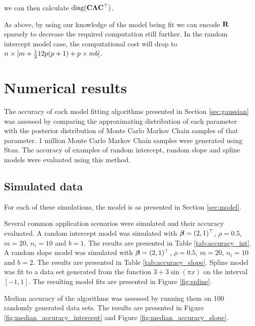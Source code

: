 \documentclass{amsart}[12pt]
\begin{document}
			\noindent we can then calculate $\text{diag}({\bf C} {\boldsymbol \Lambda} {\bf C}^\top)$.
				
			As above, by using our knowledge of the model being fit we can encode ${\bf R}$ sparsely to decrease
			the required   computation still further. In the random intercept model case, the computational cost will drop
			to   $n \times [m + \tfrac{1}{2}{1}{2} p (p + 1) + p \times m b]$.
				
			\section{Numerical results}
			\label{sec:results}
					
			The accuracy of each model fitting algorithms presented in Section \ref{sec:gaussian} was assessed by
			comparing the approximating distribution of each parameter with the posterior distribution of Monte Carlo
			Markov Chain samples of that parameter. 1 million Monte Carlo Markov Chain samples were generated using Stan.
			The accuracy of examples of random intercept, random slope and spline models were evaluated using this method.
					
			\subsection{Simulated data}
					
			For each of these simulations, the model is as presented in Section \ref{sec:model}.
					
			Several common application scenarios were simulated and their accuracy evaluated. A random intercept model was simulated with ${\boldsymbol \beta} = (2, 1)^\top$, $\rho = 0.5$, $m = 20$, $n_i = 10$ and $b = 1$. The results are
			presented in Table \ref{tab:accuracy_int}. A random slope model was simulated with ${\boldsymbol \beta} = (2, 1)^\top$,
			$\rho = 0.5$, $m = 20$, $n_i = 10$ and $b = 2$. The results are presented in Table \ref{tab:accuracy_slope}.
			Spline model was fit to a data set generated from the function $3 + 3 \sin{(\pi x)}$ on the interval $[-1,
			1]$. The resulting model fits are presented in Figure \ref{fig:spline}.
					
					
			Median accuracy of the algorithms was assessed by running them on 100 randomly generated data sets. The	results are presented in Figure \ref{fig:median_accuracy_intercept} and Figure
			\ref{fig:median_accuracy_slope}.
					
\end{document}

